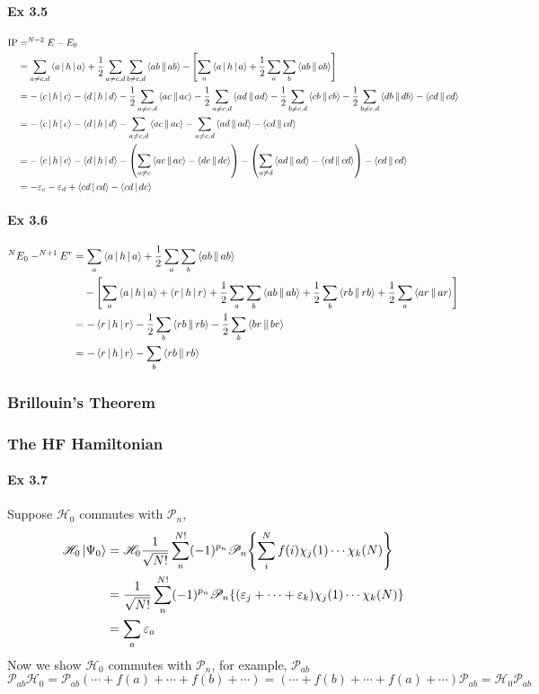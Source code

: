 \documentclass[a4paper]{article}
\newcommand{\ex}[1]{\paragraph{Ex #1}}
\numberwithin{equation}{subsection}
\begin{document}
\ex{3.5}
\begin{align}
\text{IP} &= ^{N-2}E - E_0 \notag\\
&= \sum_{a\neq c,d}\Braket{a|h|a} + \dfrac{1}{2}\sum_{a\neq c,d}\sum_{b\neq c,d} \Braket{ab||ab}  - \qty[\sum_a\Braket{a|h|a} + \dfrac{1}{2}\sum_a\sum_b \Braket{ab||ab} ] \notag\\
&= -\Braket{c|h|c} - \Braket{d|h|d} -  \dfrac{1}{2}\sum_{a\neq c,d}\Braket{ac||ac}  -  \dfrac{1}{2}\sum_{a\neq c,d}\Braket{ad||ad} - \dfrac{1}{2}\sum_{b\neq c,d} \Braket{cb||cb} - \dfrac{1}{2}\sum_{b\neq c,d} \Braket{db||db}  - \Braket{cd||cd} \notag\\
&= -\Braket{c|h|c} - \Braket{d|h|d} -  \sum_{a\neq c,d}\Braket{ac||ac}  -  \sum_{a\neq c,d}\Braket{ad||ad}   - \Braket{cd||cd} \notag\\
&= -\Braket{c|h|c} - \Braket{d|h|d} - \qty( \sum_{a\neq c}\Braket{ac||ac} - \Braket{dc||dc}) -  \qty(\sum_{a\neq d}\Braket{ad||ad} - \Braket{cd||cd})  - \Braket{cd||cd} \notag\\
&= -\varepsilon_c - \varepsilon_d + \Braket{cd|cd} - \Braket{cd|dc}
\end{align}

\ex{3.6}
\begin{align}
^N E_0 - ^{N+1}E^r &= \sum_a\Braket{a|h|a} + \dfrac{1}{2}\sum_a\sum_b \Braket{ab||ab} \notag\\
&{}\quad - \qty[\sum_a\Braket{a|h|a} + \Braket{r|h|r} + \dfrac{1}{2}\sum_a\sum_b \Braket{ab||ab} + \dfrac{1}{2}\sum_b \Braket{rb||rb} + \dfrac{1}{2}\sum_a \Braket{ar||ar}] \notag\\
&= - \Braket{r|h|r} - \dfrac{1}{2}\sum_b \Braket{rb||rb} - \dfrac{1}{2}\sum_b \Braket{br||br} \notag\\
&= - \Braket{r|h|r} - \sum_b \Braket{rb||rb}
\end{align}

\subsubsection{Brillouin's Theorem}
\subsubsection{The HF Hamiltonian}
\ex{3.7}
Suppose $ \mathscr{H}_0 $ commutes with $ \mathscr{P}_n $,
\begin{align}\label{key}
\mathscr{H}_0\ket{\Psi_0} &= \mathscr{H}_0 \dfrac{1}{\sqrt{N!}} \sum_n^{N!}(-1)^{p_n} \mathscr{P}_n \qty{\sum_i^N  f(i)\chi_j(1)\cdots\chi_k(N)} \notag\\
&= \dfrac{1}{\sqrt{N!}} \sum_n^{N!}(-1)^{p_n} \mathscr{P}_n \qty{ (\varepsilon_j + \cdots + \varepsilon_k) \chi_j(1)\cdots\chi_k(N)} \notag\\
&= \sum_a \varepsilon_a
\end{align}
Now we show $ \mathscr{H}_0 $ commutes with $ \mathscr{P}_n $, for example, $ \mathscr{P}_{ab} $
\begin{equation}\label{key}
\mathscr{P}_{ab}\mathscr{H}_0 = \mathscr{P}_{ab}(\cdots + f(a) + \cdots + f(b) + \cdots) = (\cdots + f(b) + \cdots + f(a) + \cdots)\mathscr{P}_{ab} = \mathscr{H}_0 \mathscr{P}_{ab}
\end{equation}
\end{document}

